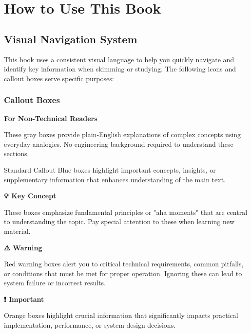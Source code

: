\chapter*{How to Use This Book}

\section*{Visual Navigation System}

This book uses a consistent visual language to help you quickly navigate and identify key information when skimming or studying. The following icons and callout boxes serve specific purposes:

\subsection*{Callout Boxes}

\begin{nontechnical}
\textbf{For Non-Technical Readers}

These gray boxes provide plain-English explanations of complex concepts using everyday analogies. No engineering background required to understand these sections.
\end{nontechnical}

\begin{calloutbox}{Standard Callout}
Blue boxes highlight important concepts, insights, or supplementary information that enhances understanding of the main text.
\end{calloutbox}

\begin{keyconcept}
\textbf{💡 Key Concept}

These boxes emphasize fundamental principles or "aha moments" that are central to understanding the topic. Pay special attention to these when learning new material.
\end{keyconcept}

\begin{warning}
\textbf{⚠️ Warning}

Red warning boxes alert you to critical technical requirements, common pitfalls, or conditions that must be met for proper operation. Ignoring these can lead to system failure or incorrect results.
\end{warning}

\begin{important}
\textbf{❗ Important}

Orange boxes highlight crucial information that significantly impacts practical implementation, performance, or system design decisions.
\end{important}

